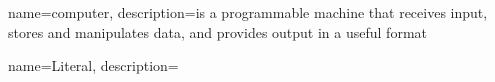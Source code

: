 
{
    name=computer,
    description={is a programmable machine that receives input,
    stores and manipulates data, and provides
    output in a useful format}
}

{
    name=Literal,
    description={}
}